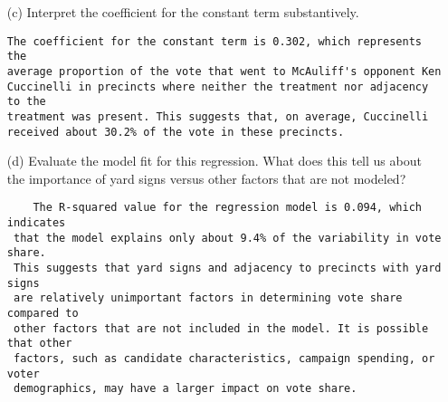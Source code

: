 \documentclass[12pt,letterpaper]{article}
\begin{document}
\begin{enumerate}
	\item [(c)] Interpret the coefficient for the constant term substantively.
	\begin{verbatim}
The coefficient for the constant term is 0.302, which represents the
average proportion of the vote that went to McAuliff's opponent Ken
Cuccinelli in precincts where neither the treatment nor adjacency to the
treatment was present. This suggests that, on average, Cuccinelli
received about 30.2% of the vote in these precincts.
    \end{verbatim}	
	
	\item [(d)] Evaluate the model fit for this regression.  What does this	tell us about the importance of yard signs versus other factors that are not modeled?
	\begin{verbatim}
	The R-squared value for the regression model is 0.094, which indicates
 that the model explains only about 9.4% of the variability in vote share.
 This suggests that yard signs and adjacency to precincts with yard signs
 are relatively unimportant factors in determining vote share compared to
 other factors that are not included in the model. It is possible that other
 factors, such as candidate characteristics, campaign spending, or voter
 demographics, may have a larger impact on vote share.

   \end{verbatim}	
\end{enumerate}  
\end{document}
